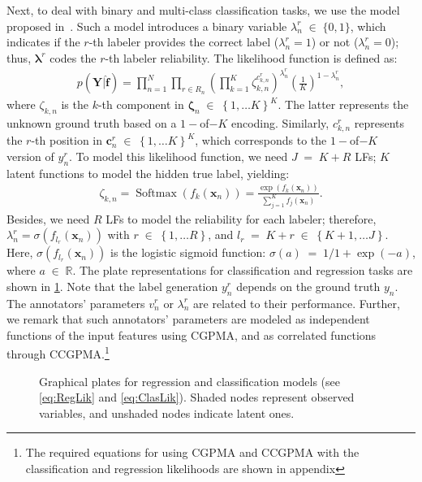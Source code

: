 \documentclass[journal]{IEEEtran}
\providecommand{\ve}[1]{{\bm{#1}}}%
\providecommand{\mat}[1]{{\bm{#1}}} %
\newcommand{\Real}{\mathbb{R}}
\DeclareMathOperator{\en}{\!\,\in\!\,}
\DeclareMathOperator{\igual}{\!\,=\!\,}
\providecommand{\ve}[1]{{\mathbf{#1}}}
\providecommand{\mat}[1]{{\mathbf{#1}}}
\newcommand{\boldc}{\mathbf{c}} %
\newcommand{\boldx}{\mathbf{x}}
\begin{document}
Next, to deal with binary and multi-class classification tasks, we use the model proposed in~\cite{rodrigues2013learning}. Such a model introduces a binary variable $\lambda_n^r\en \{0,1\}$, which indicates if the $r$-th labeler provides the correct label ($\lambda_n^r=1$) or not ($\lambda_n^r=0$); thus, $\bm{\lambda}^r$ codes the $r$-th labeler reliability. The likelihood function is defined as:
\begin{align}
\label{eq:ClasLik}
p(\mat{Y}|\hat{\ve{f}}) = \prod^N_{n=1}\prod_{r\in R_n}\left(\prod_{k=1}^{K}\zeta_{k,n}^{c_{k,n}^r}\right)^{\lambda_n^r}\left(\frac{1}{K}\right)^{1-\lambda_n^r},
\end{align}
where $\zeta_{k,n}$ is the $k$-th component in $\bm{\zeta}_n \en\left\{1,\dots K \right\}^{K}$. The latter represents the unknown ground truth based on a $1-$of$-K$ encoding. Similarly, $c_{k,n}^r$ represents the $r$-th position in $\boldc_n^r\en\left\{1,\dots K \right\}^{K}$, which corresponds to the $1-$of$-K$ version of $y_n^r$. To model this likelihood function, we need $J\igual K+R$ LFs; $K$ latent functions to model the hidden true label, yielding:
\begin{align}
\zeta_{k,n} =\operatorname{Softmax}(f_k(\boldx_n))= \frac{\exp(f_k(\boldx_n))}{\sum_{j=1}^{K}f_j(\boldx_n)}.
\end{align}
Besides, we need $R$ LFs to model the reliability for each labeler; therefore, $\lambda_n^r=\sigma(f_{l_r}(\boldx_n))$ with $r\en \left\{1, \dots R\right\}$, and $l_r \igual K+r \en \left\{K+1, \dots J\right\}$. Here, $\sigma(f_{l_r}(\boldx_n))$ is the logistic sigmoid function: $\sigma(a)\igual{1}/{1+\exp(-a)}$, where $a\en\Real.$  The plate representations for classification and regression tasks are shown in \cref{fig:GM}. Note that the label generation $y_n^r$ depends on the ground truth $y_n$. The annotators' parameters $v_n^r$ or $\lambda_n^r$ are related to their performance. Further, we remark that such annotators' parameters are modeled as independent functions of the input features using CGPMA, and as correlated functions through CCGPMA.\footnote{The required equations for using CGPMA and CCGPMA with the classification and regression likelihoods are shown in appendix}
\begin{figure}[tb!]
	\centering
	\hspace{0.5cm}
	\caption{Graphical plates for regression and classification models (see \cref{eq:RegLik} and \cref{eq:ClasLik}). Shaded nodes represent observed variables, and unshaded nodes indicate latent ones.}
	\label{fig:GM}
\end{figure}
\end{document}
